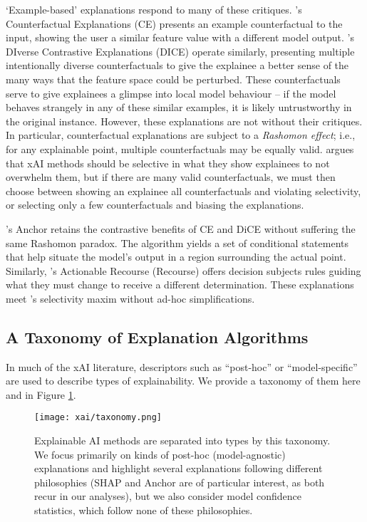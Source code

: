 `Example-based' explanations respond to many of these critiques. \textcite{wachter_counterfactual_2017}'s Counterfactual Explanations (CE) presents an example counterfactual to the input, showing the user a similar feature value with a different model output. \textcite{mothilal_explaining_2019}'s DIverse Contrastive Explanations (DICE) operate similarly, presenting multiple intentionally diverse counterfactuals to give the explainee a better sense of the many ways that the feature space could be perturbed. These counterfactuals serve to give explainees a glimpse into local model behaviour – if the model behaves strangely in any of these similar examples, it is likely untrustworthy in the original instance. However, these explanations are not without their critiques. In particular, counterfactual explanations are subject to a \emph{Rashomon effect}; i.e., for any explainable point, multiple counterfactuals may be equally valid. \textcite{miller_explanation_2017} argues that xAI methods should be selective in what they show explainees to not overwhelm them, but if there are many valid counterfactuals, we must then choose between showing an explainee all counterfactuals and violating selectivity, or selecting only a few counterfactuals and biasing the explanations.

\textcite{ribeiro_anchors_2018}'s Anchor retains the contrastive benefits of CE and DiCE without suffering the same Rashomon paradox. The algorithm yields a set of conditional statements that help situate the model's output in a region surrounding the actual point. Similarly, \textcite{ustun_actionable_2019}'s Actionable Recourse (Recourse) offers decision subjects rules guiding what they must change to receive a different determination. These explanations meet \textcite{miller_explanation_2017}'s selectivity maxim without ad-hoc simplifications.

\subsection{A Taxonomy of Explanation Algorithms}
In much of the xAI literature, descriptors such as ``post-hoc'' or ``model-specific'' are used to describe types of explainability. We provide a taxonomy of them here and in Figure \ref{fig:taxonomy}.

\begin{figure}[htbp]
    \centering
    \texttt{[image: xai/taxonomy.png]}
    \caption{Explainable AI methods are separated into types by this taxonomy. We focus primarily on kinds of post-hoc (model-agnostic) explanations and highlight several explanations following different philosophies (SHAP and Anchor are of particular interest, as both recur in our analyses), but we also consider model confidence statistics, which follow none of these philosophies.}
    \label{fig:taxonomy}
\end{figure}

